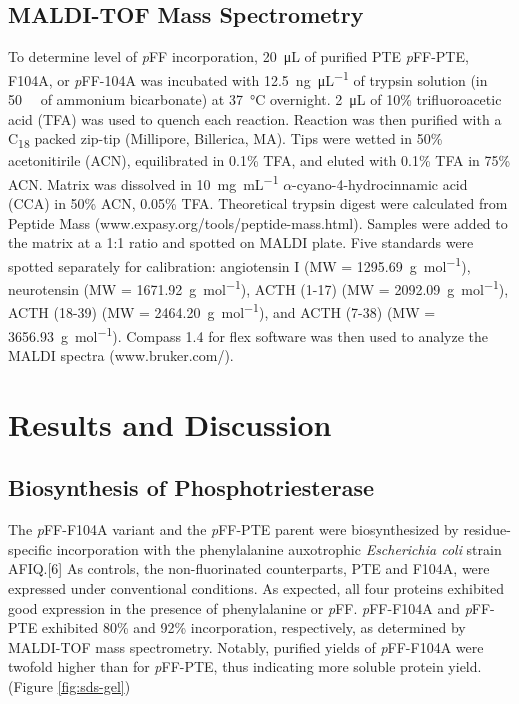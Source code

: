\begin{refsection}
\subsection{MALDI-TOF Mass Spectrometry}

To determine level of \emph{p}FF incorporation, \SI{20}{\micro\liter} of
purified PTE \emph{p}FF-PTE, F104A, or \emph{p}FF-104A was incubated with
\SI{12.5}{\ng\per\uL} of trypsin solution (in \SI{50}{\milli\Molar} of ammonium
bicarbonate) at \SI{37}{\celsius} overnight. \SI{2}{\uL} of 10\%
trifluoroacetic acid (TFA) was used to quench each reaction. Reaction was then
purified with a C\textsubscript{18} packed zip-tip (Millipore, Billerica, MA).
Tips were wetted in 50\% acetonitirile (ACN), equilibrated in 0.1\% TFA, and
eluted with 0.1\% TFA in 75\% ACN. Matrix was dissolved in \SI{10}{\mg\per\mL}
$\alpha$-cyano-4-hydrocinnamic acid (CCA) in 50\% ACN, 0.05\% TFA. Theoretical
trypsin digest were calculated from Peptide Mass
(www.expasy.org/tools/peptide-mass.html). Samples were added to the matrix at a
1:1 ratio and spotted on MALDI plate. Five standards were spotted separately
for calibration: angiotensin I (MW = \SI{1295.69}{\g\per\mole}), neurotensin
(MW = \SI{1671.92}{\g\per\mole}), ACTH (1-17) (MW = \SI{2092.09}{\g\per\mole}),
ACTH (18-39) (MW = \SI{2464.20}{\g\per\mole}), and ACTH (7-38) (MW =
\SI{3656.93}{\g\per\mole}).  Compass 1.4 for flex software was then used to
analyze the MALDI spectra (www.bruker.com/).

\section{Results and Discussion}

\subsection{Biosynthesis of Phosphotriesterase}

The \emph{p}FF-F104A variant and the \emph{p}FF-PTE parent were biosynthesized
by residue-specific incorporation with the phenylalanine auxotrophic
\emph{Escherichia coli} strain AFIQ.[6] As controls, the non-fluorinated
counterparts, PTE and F104A, were expressed under conventional conditions. As
expected, all four proteins exhibited good expression in the presence of
phenylalanine or \emph{p}FF. \emph{p}FF-F104A and \emph{p}FF-PTE exhibited 80\%
and 92\% incorporation, respectively, as determined by MALDI-TOF mass
spectrometry. Notably, purified yields of \emph{p}FF-F104A were twofold higher
than for \emph{p}FF-PTE, thus indicating more soluble protein yield. (Figure
\ref{fig:sds-gel})


\end{refsection}

